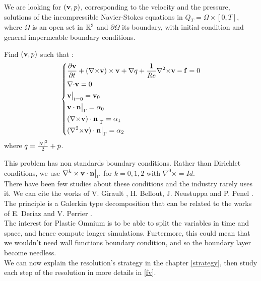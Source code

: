 We are looking for $({\mathbf{v}},p)$, corresponding to the velocity and the pressure, solutions of the incompressible Navier-Stokes equations in $Q_T=\Omega\times[0,T]$, where $\Omega$ is an open set in ${\mathbb{R}}^3$ and $\partial\Omega$ its boundary, with initial condition and general impermeable boundary conditions.
\begin{pb}\label{start}
Find $({\mathbf{v}},p)$ such that :
\begin{equation*}
\left\{\begin{aligned}
&\frac{\partial {\mathbf{v}}}{\partial t} + ({\nabla\times}  {\mathbf{v}})\times {\mathbf{v}} + {\nabla} q + \frac{1}{Re}{\nabla^2\times}  {\mathbf{v}}-{\mathbf{f}} = 0\\
&{\nabla\cdot} {\mathbf{v}} = 0\\
&{\mathbf{v}}\big\rvert_{t=0} = {\mathbf{v}}_0\\
&{\mathbf{v}}\cdot {\mathbf{n}}{\big\rvert_{\Gamma}} = \alpha_0\\
&({\nabla\times}  {\mathbf{v}})\cdot {\mathbf{n}}{\big\rvert_{\Gamma}} = \alpha_1\\
&({\nabla^2\times}  {\mathbf{v}})\cdot {\mathbf{n}}{\big\rvert_{\Gamma}} = \alpha_2
\end{aligned}\right.
\end{equation*}
where $q = \frac{|{\mathbf{v}}|^2}{2}+p$.\\
\end{pb}
This problem has non standards boundary conditions. Rather than Dirichlet conditions, we use $\nabla^k\times{\mathbf{v}}\cdot{\mathbf{n}}{\big\rvert_{\Gamma}}$ for $k=0,1,2$ with $\nabla^0\times=Id$.\\
There have been few studies about these conditions and the industry rarely uses it. We can cite the works of V. Girault \cite{girault90-1}, H. Bellout, J. Neustuppa and P. Penel \cite{Penel2004}. The principle is a Galerkin type decomposition that can be related to the works of E. Deriaz and V. Perrier \cite{Deriaz2009249}.\\

The interest for Plastic Omnium is to be able to split the variables in time and space, and hence compute longer simulations. Furtermore, this could mean that we wouldn't need wall functions boundary condition, and so the boundary layer become needless.\\ 

We can now explain the resolution's strategy in the chapter \ref{strategy}, then study each step of the resolution in more details in \ref{fv}.


